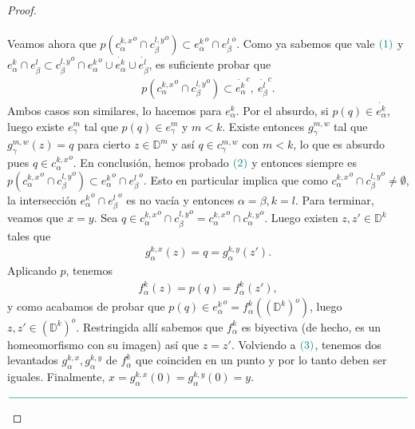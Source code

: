 \documentclass[11pt]{article}
\newcommand{\D}{\mathbb{D}}
\newcommand{\tint}[1]{#1^o}%
\newcommand{\paint}[2]{\color{#1}{#2}}
\begin{document}
\begin{proof}
\begin{itemize}
\begin{align}
\end{align}
Veamos ahora que $p(\tint{{c_\alpha^{k,x}}} \cap \tint{{c_\beta^{l,y}}}) \subset \tint{{ e_\alpha^k}} \cap \tint{{e_\beta^l}}$. Como ya sabemos que vale $\paint{grey-light-blue}{(1)}$ y  $e_\alpha^k \cap e_\beta^l \subset \tint{{c_\beta^{l,y}}} \cap \tint{{ e_\alpha^k}} \cup \dot{e_\alpha^k} \cup \dot{e_\beta^l}$, es suficiente probar que
\begin{align}
p(\tint{{c_\alpha^{k,x}}} \cap \tint{{c_\beta^{l,y}}}) \subset \dot{e_\alpha^k}^c, \ \dot{e_\beta^l}^c.
\end{align}
Ambos casos son similares, lo hacemos para $e_\alpha^k$. Por el absurdo, si $p(q) \in \dot{e_\alpha^k}$, luego existe $e_\gamma^m$ tal que $p(q) \in e_\gamma^m$ y $m < k$. Existe entonces $g_\gamma^{m,w}$ tal que $g_\gamma^{m,w}(z) = q$ para cierto $z \in \D^m$ y as\'i $q \in c_\gamma^{m,w}$ con $m < k$, lo que es absurdo pues $q \in \tint{{c_\alpha^{k,x}}}$. En conclusi\'on, hemos probado $\paint{grey-light-blue}{(2)}$ y entonces siempre es $p(\tint{{c_\alpha^{k,x}}} \cap \tint{{c_\beta^{l,y}}}) \subset \tint{{ e_\alpha^k}} \cap \tint{{e_\beta^l}}$. Esto en particular implica que como $\tint{{c_\alpha^{k,x}}} \cap \tint{{c_\beta^{l,y}}} \neq \emptyset$, la intersecci\'on $\tint{{ e_\alpha^k}} \cap \tint{{e_\beta^l}}$ es no vac\'ia y entonces $\alpha = \beta, k = l$. Para terminar, veamos que $x = y$. Sea $q \in \tint{{c_\alpha^{k,x}}} \cap \tint{{c_\beta^{l,y}}} = \tint{{c_\alpha^{k,x}}} \cap \tint{{c_\alpha^{k,y}}}$. Luego existen $z,z' \in \D^k$ tales que 
\begin{align}
g_\alpha^{k,x}(z) = q = g_\alpha^{k,y}(z').
\end{align}
Aplicando $p$, tenemos
\begin{align*}
f_\alpha^k(z) = p(q) = f_\alpha^k(z'), 
\end{align*}
y como acabamos de probar que $p(q) \in \tint{{ e_\alpha^k}} = f_\alpha^k(\tint{(\D^k)})$, luego $z,z' \in \tint{(\D^k)}$. Restringida all\'i sabemos que $f_\alpha^k$ es biyectiva (de hecho, es un homeomorfismo con su imagen) as\'i que $z = z'$. Volviendo a $\paint{grey-light-blue}{(3)}$, tenemos dos levantados $g_\alpha^{k,x}, g_\alpha^{k,y}$ de $f_\alpha^k$ que coinciden en un punto y por lo tanto deben ser iguales. Finalmente, $x = g_\alpha^{k,x}(0) = g_\alpha^{k,y}(0) = y$.

\begin{center}
$\paint{grey-light-blue}{
\rule{400pt}{0.5pt}
}$
\end{center}


\end{itemize}
\end{proof}
\end{document}
